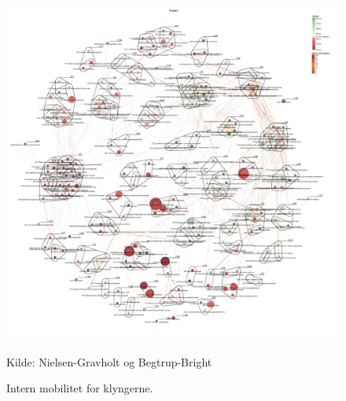 \begin{figure}[H]
\begin{center}
  \caption{Intern mobilitet for klyngerne.}
  \label{fig_analyse_deskriptivt_kort_timelon}
  \includegraphics[width=1.0\textwidth]{fig/netvaerkskort/kort_timelon.pdf}
  \centerline{ \tiny{Kilde: Nielsen-Gravholt og Begtrup-Bright}}
\end{center}
\end{figure}
\restoregeometry

